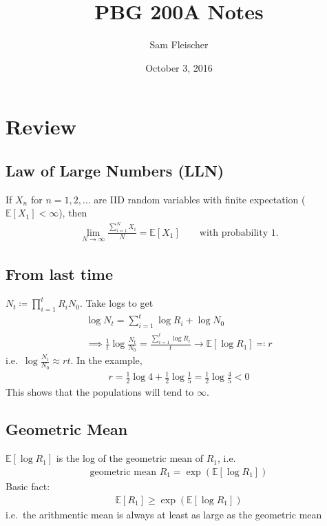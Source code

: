 \documentclass{article}
\title{PBG 200A Notes}
\author{Sam Fleischer}
\date{October 3, 2016}
\newcommand{\expec}{\mathbb{E}}
\begin{document}
    \maketitle

    \section{Review}
        \subsection{Law of Large Numbers (LLN)}
            If $X_n$ for $n = 1, 2, \dots$ are IID random variables with finite expectation ($\expec[X_1] < \infty$), then
            \begin{align*}
                \lim_{N\rightarrow\infty}\frac{\sum_{i=1}^N X_i}{N} = \expec[X_1] \qquad \text{with probability 1}.
            \end{align*}
        \subsection{From last time}
            $N_t \coloneqq \prod_{i=1}^tR_iN_0$.  Take logs to get
            \begin{align*}
                \log N_t = \sum_{i=1}^t \log R_i + \log N_0 \\
                \implies \frac{1}{t}\log\frac{N_t}{N_0} = \frac{\sum_{i=1}^t\log R_i}{t} \rightarrow \expec[\log R_1] \eqqcolon r
            \end{align*}
            i.e.~$\log\frac{N_t}{N_0} \approx rt$.  In the example,
            \begin{align*}
                r = \frac{1}{2}\log 4 + \frac{1}{2}\log\frac{1}{5} = \frac{1}{2}\log\frac{4}{5}<0
            \end{align*}
            This shows that the populations will tend to $\infty$.
        \subsection{Geometric Mean}
            $\expec[\log R_1]$ is the log of the geometric mean of $R_1$, i.e.
            \begin{align*}
                \text{geometric mean } R_1 = \exp(\expec[\log R_1])
            \end{align*}
            Basic fact:
            \begin{align*}
                \expec[R_1] \geq \exp(\expec[\log R_1])
            \end{align*}
            i.e.~the arithmentic mean is always at least as large as the geometric mean
\end{document}

